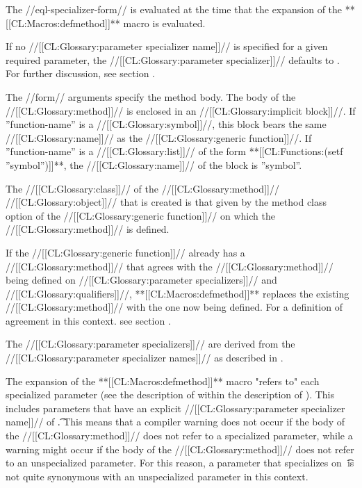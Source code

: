 The //eql-specializer-form// is evaluated at the time that the expansion of the **[[CL:Macros:defmethod]]** macro is evaluated.

If no //[[CL:Glossary:parameter specializer name]]// is specified for a given required parameter, the //[[CL:Glossary:parameter specializer]]// defaults to . For further discussion, see section {\secref\IntroToMethods}.

The //form// arguments specify the method body. The body of the //[[CL:Glossary:method]]// is enclosed in an //[[CL:Glossary:implicit block]]//. If ''function-name'' is a //[[CL:Glossary:symbol]]//, this block bears the same //[[CL:Glossary:name]]// as the //[[CL:Glossary:generic function]]//. If ''function-name'' is a //[[CL:Glossary:list]]// of the form **[[CL:Functions:(setf ''symbol'')]]**, the //[[CL:Glossary:name]]// of the block is ''symbol''.

The //[[CL:Glossary:class]]// of the //[[CL:Glossary:method]]// //[[CL:Glossary:object]]// that is created is that given by the method class option of the //[[CL:Glossary:generic function]]// on which the //[[CL:Glossary:method]]// is defined.

If the //[[CL:Glossary:generic function]]// already has a //[[CL:Glossary:method]]// that agrees with the //[[CL:Glossary:method]]// being defined on //[[CL:Glossary:parameter specializers]]// and //[[CL:Glossary:qualifiers]]//, **[[CL:Macros:defmethod]]** replaces the existing //[[CL:Glossary:method]]// with the one now being defined. For a definition of agreement in this context. see section {\secref\SpecializerQualifierAgreement}.

The //[[CL:Glossary:parameter specializers]]// are derived from the //[[CL:Glossary:parameter specializer names]]// as described in \secref\IntroToMethods.

The expansion of the **[[CL:Macros:defmethod]]** macro "refers to" each specialized parameter (see the description of  within the description of ). This includes parameters that have an explicit //[[CL:Glossary:parameter specializer name]]// of \t. This means that a compiler warning does not occur if the body of the //[[CL:Glossary:method]]// does not refer to a specialized parameter, while a warning might occur if the body of the //[[CL:Glossary:method]]// does not refer to an unspecialized parameter. For this reason, a parameter that specializes on \t\ is not quite synonymous with an unspecialized parameter in this context.

